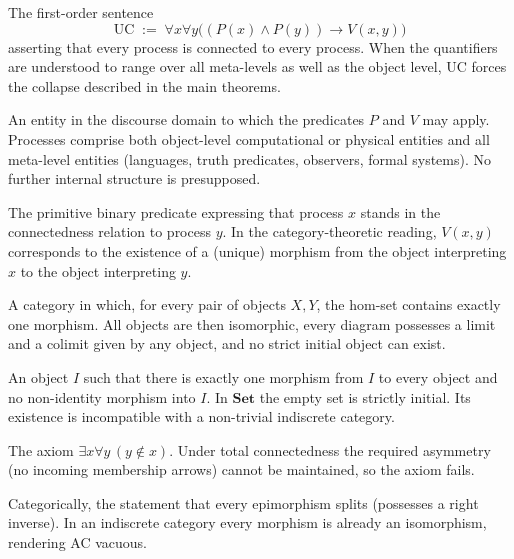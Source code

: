 \documentclass[11pt,a4paper]{article}
\theoremstyle{definition}
\begin{document}
\begin{description}[style=nextline, leftmargin=1.5cm]

\item[Universal Connectedness (UC)]
The first-order sentence
\[
\mathrm{UC}\;:=\;\forall x\forall y\bigl((P(x)\land P(y))\to V(x,y)\bigr)
\]
asserting that every process is connected to every process. When the quantifiers are understood to range over all meta-levels as well as the object level, UC forces the collapse described in the main theorems.

\item[Process]
An entity in the discourse domain to which the predicates \(P\) and \(V\) may apply. Processes comprise both object-level computational or physical entities and all meta-level entities (languages, truth predicates, observers, formal systems). No further internal structure is presupposed.

\item[Connection predicate \(V(x,y)\)]
The primitive binary predicate expressing that process \(x\) stands in the connectedness relation to process \(y\). In the category-theoretic reading, \(V(x,y)\) corresponds to the existence of a (unique) morphism from the object interpreting \(x\) to the object interpreting \(y\).

\item[Indiscrete (chaotic) category]
A category in which, for every pair of objects \(X,Y\), the hom-set contains exactly one morphism. All objects are then isomorphic, every diagram possesses a limit and a colimit given by any object, and no strict initial object can exist.

\item[Strict initial object]
An object \(I\) such that there is exactly one morphism from \(I\) to every object and no non-identity morphism into \(I\). In \(\mathbf{Set}\) the empty set is strictly initial. Its existence is incompatible with a non-trivial indiscrete category.

\item[Empty-set axiom]
The axiom \(\exists x\forall y\,(y\notin x)\). Under total connectedness the required asymmetry (no incoming membership arrows) cannot be maintained, so the axiom fails.

\item[Axiom of Choice (AC)]
Categorically, the statement that every epimorphism splits (possesses a right inverse). In an indiscrete category every morphism is already an isomorphism, rendering AC vacuous.


\end{description}
\end{document}
